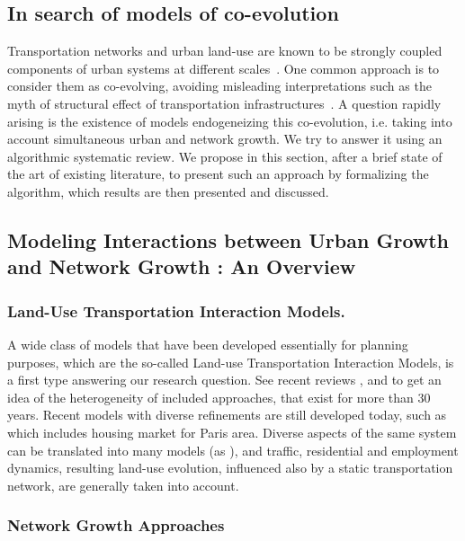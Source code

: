 \subsection{In search of models of co-evolution}


Transportation networks and urban land-use are known to be strongly coupled components of urban systems at different scales~\cite{bretagnolle2009organization}. One common approach is to consider them as co-evolving, avoiding misleading interpretations such as the myth of structural effect of transportation infrastructures~\cite{offner1993effets}. A question rapidly arising is the existence of models endogeneizing this co-evolution, i.e. taking into account simultaneous urban and network growth. We try to answer it using an algorithmic systematic review. We propose in this section, after a brief state of the art of existing literature, to present such an approach by formalizing the algorithm, which results are then presented and discussed. 

\subsection{Modeling Interactions between Urban Growth and Network Growth : An Overview}

\subsubsection{Land-Use Transportation Interaction Models.}

A wide class of models that have been developed essentially for planning purposes, which are the so-called Land-use Transportation Interaction Models, is a first type answering our research question. See recent reviews \cite{chang2006models}, \cite{iacono2008models} and \cite{wegener2004land} to get an idea of the heterogeneity of included approaches, that exist for more than 30 years. Recent models with diverse refinements are still developed today, such as \cite{delons:hal-00319087} which includes housing market for Paris area. Diverse aspects of the same system can be translated into many models (as \eg \cite{wegener1991one}), and traffic, residential and employment dynamics, resulting land-use evolution, influenced also by a static transportation network, are generally taken into account.

\subsubsection{Network Growth Approaches}


